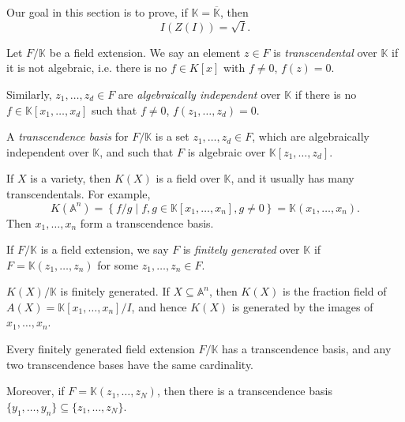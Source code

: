 \documentclass[12pt]{article}
\begin{document}
Our goal in this section is to prove, if $\mathbb{K} = \overline{\mathbb{K}}$, then
\[
I(Z(I)) = \sqrt I.
\]

\begin{definition}
	Let $F / \mathbb{K}$ be a field extension. We say an element $z \in F$ is \emph{transcendental} over $\mathbb{K}$ if it is not algebraic, i.e. there is no $f \in K[x]$ with $f \neq 0$, $f(z) = 0$.

	Similarly, $z_1, \ldots, z_d \in F$ are \emph{algebraically independent} over $\mathbb{K}$ if there is no $f \in \mathbb{K}[x_1, \ldots, x_d]$ such that $f \neq 0$, $f(z_1, \ldots, z_d) = 0$.

	A \emph{transcendence basis} for $F / \mathbb{K}$ is a set $z_1, \ldots, z_d \in F$, which are algebraically independent over $\mathbb{K}$, and such that $F$ is algebraic over $\mathbb{K}[z_1, \ldots, z_d]$.
\end{definition}

\begin{exbox}
	If $X$ is a variety, then $K(X)$ is a field over $\mathbb{K}$, and it usually has many transcendentals. For example,
	\[
		K(\mathbb{A}^n) = \left\{ f/g \mid f, g \in \mathbb{K}[x_1, \ldots, x_n], g \neq 0\right\} = \mathbb{K}(x_1, \ldots, x_n).
	\]
	Then $x_1, \ldots, x_n$ form a transcendence basis.
\end{exbox}

\begin{definition}
	If $F / \mathbb{K}$ is a field extension, we say $F$ is \emph{finitely generated} over $\mathbb{K}$ if $F = \mathbb{K}(z_1, \ldots, z_n)$ for some $z_1, \ldots, z_n \in F$.
\end{definition}

\begin{exbox}
	$K(X)/\mathbb{K}$ is finitely generated. If $X \subseteq \mathbb{A}^n$, then $K(X)$ is the fraction field of $A(X) = \mathbb{K}[x_1, \ldots, x_n]/I$, and hence $K(X)$ is generated by the images of $x_1, \ldots, x_n$.
\end{exbox}

\begin{proposition}
	Every finitely generated field extension $F/\mathbb{K}$ has a transcendence basis, and any two transcendence bases have the same cardinality.

	Moreover, if $F = \mathbb{K}(z_1, \ldots, z_N)$, then there is a transcendence basis $\{y_1, \ldots, y_n\} \subseteq \{z_1, \ldots, z_N\}$.
\end{proposition}
\end{document}
